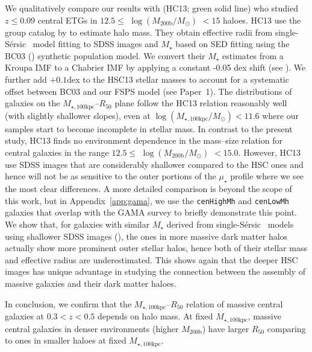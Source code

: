 \documentclass[a4paper,fleqn,usenatbib]{mnras}
\def\ser{{S\'{e}rsic\ }}
\def\rbcg{\texttt{cenHighMh}}
\def\nbcg{\texttt{cenLowMh}}
\def\mstar{{$M_{\star}$}}
\def\mhalo{{$M_{\mathrm{200b}}$}}
\def\logmh{{$\log (M_{\mathrm{200b}}/M_{\odot})$}}
\def\mtot{{$M_{\star,100\mathrm{kpc}}$}}
\def\logmtot{{$\log (M_{\star,100\mathrm{kpc}}/M_{\odot})$}}
\def\mden{{$\mu_{\star}$}}
\begin{document}
    We qualitatively compare our results with \citealt{HCompany13} (HC13; 
    green solid line) who studied $z\leq 0.09$ central ETGs in 
    $12.5 \le$ \logmh{} $< 15$ haloes. 
    HC13 use the group catalog by \citet{Yang2007} to estimate halo mass. 
    They obtain effective radii from single-\ser{} model fitting to SDSS 
    images and \mstar{} based on SED fitting using the BC03 (\citealt{BC03}) 
    synthetic population model. 
    We convert their \mstar{} estimates from a Kroupa IMF to a Chabrier 
    IMF by applying a constant -0.05 dex shift (see \citealt{Bernardi2016a}). 
    We further add $+0.1$dex to the HSC13 stellar masses to account for a systematic 
    offset between BC03 and our FSPS model (see Paper~1). 
    The distributions of galaxies on the 
    \mtot{}--$R_{\mathrm{50}}$ plane follow the HC13 relation reasonably well 
    (with slightly shallower slopes), even at \logmtot{}$< 11.6$ where our samples 
    start to become incomplete in stellar mass. 
    In contrast to the present study, HC13 finds no environment dependence in the 
    mass--size relation for central galaxies in the range $12.5\le$ \logmh{} $<15.0$.     
    However, HC13 use SDSS images that are considerably shallower compared to the HSC 
    ones and hence will not be as sensitive to the outer portions of the \mden{} 
    profile where we see the most clear differences. 
    A more detailed comparison is beyond the scope of this work, but in 
    Appendix~\ref{app:gama}, we use the \rbcg{} and \nbcg{} galaxies that overlap 
    with the GAMA survey to briefly demonstrate this point. 
    We show that, for galaxies with similar \mstar{} derived from single-\ser{} 
    models using shallower SDSS images (\citealt{Kelvin2012}), the ones in more 
    massive dark matter halos actually show more prominent outer stellar halos, 
    hence both of their stellar mass and effective radius are underestimated.  
    This shows again that the deeper HSC images has unique advantage in studying the
    connection between the assembly of massive galaxies and their dark matter haloes. 

    In conclusion, we confirm that the \mtot{}--$R_{\mathrm{50}}$ relation of massive
    central galaxies at $0.3 < z < 0.5$ depends on halo mass. 
    At fixed \mtot{}, massive central galaxies in denser environments (higher \mhalo{}) 
    have larger $R_{\mathrm{50}}$ comparing to ones in smaller haloes at fixed 
    \mtot{}. 
    
\end{document}
